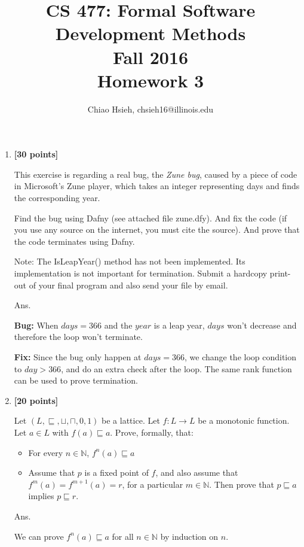 \documentclass{article}
\title{\Large\bfseries CS 477: Formal Software Development Methods \\
Fall 2016 \\
Homework 3}
\author{Chiao Hsieh, chsieh16@illinois.edu}
\begin{document}
\maketitle

\begin{enumerate}
\item \textbf{[30 points]}

This exercise is regarding a real bug, the \textit{Zune bug},
caused by a piece of code in Microsoft's Zune player,
which takes an integer representing days and finds the corresponding year.

Find the bug using Dafny (see attached file zune.dfy).
And fix the code (if you use any source on the internet,
you must cite the source).
And prove that the code terminates using Dafny.

Note: The IsLeapYear() method has not been implemented.
Its implementation is not important for termination.
Submit a hardcopy print-out of your final program and also send your file by email.

\medskip
Ans.
\medskip

\textbf{Bug:} When $days = 366$ and the $year$ is a leap year,
$days$ won't decrease and therefore the loop won't terminate.

\textbf{Fix:}
Since the bug only happen at $days = 366$,
we change the loop condition to $day > 366$,
and do an extra check after the loop.
The same rank function can be used to prove termination.


\item \textbf{[20 points]}

Let $(L, \sqsubseteq, \sqcup, \sqcap, 0, 1)$ be a lattice.
Let $f : L \to L$ be a monotonic function.
Let $a \in L$ with $f(a) \sqsubseteq a$.
Prove, formally, that:

\begin{itemize}
    \item For every $n \in \mathbb{N}$, $f^n(a)\sqsubseteq a$
    \item Assume that $p$ is a fixed point of $f$,
          and also assume that $f^m(a) = f^{m+1}(a) = r$,
          for a particular $m \in \mathbb{N}$.
          Then prove that $p \sqsubseteq a$ implies $p \sqsubseteq r$.
\end{itemize}

\medskip
Ans.
\medskip


We can prove $f^n(a)\sqsubseteq a$ for all $n \in \mathbb{N}$ by induction on $n$.


\end{enumerate}
\end{document}
